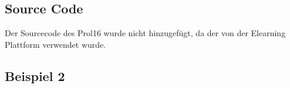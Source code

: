 \documentclass[12pt,a4paper]{article}
\begin{document}
\subsection{Source Code}

Der Sourcecode des Prol16 wurde nicht hinzugefügt, da der von der Elearning Plattform verwendet wurde.







%





\subsection{Beispiel 2}
\end{document}
